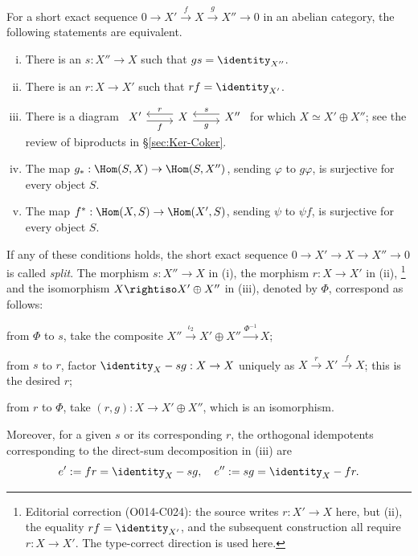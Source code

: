 \begin{proposition}\label{prop:split-ses}
	For a short exact sequence
	$0\to X'\xrightarrow{f}X\xrightarrow{g}X''\to0$ in an abelian category,
	the following statements are equivalent.
	\begin{enumerate}[(i)]
		\item There is an $s:X''\to X$ such that $gs=\identity_{X''}$.
		\item There is an $r:X\to X'$ such that $rf=\identity_{X'}$.
		\item There is a diagram
		$\begin{tikzcd}
			X' \arrow[yshift=-0.7ex, r, "f"'] & X \arrow[yshift=0.7ex, l, "r"'] \arrow[yshift=-0.7ex, r, "g"'] & X'' \arrow[yshift=0.7ex, l, "s"']
		\end{tikzcd}$
		for which $X\simeq X'\oplus X''$; see the review of biproducts in
		\S\ref{sec:Ker-Coker}.
		\item The map $g_*:\Hom(S,X)\to\Hom(S,X'')$, sending $\varphi$ to
		$g\varphi$, is surjective for every object $S$.
		\item The map $f^*:\Hom(X,S)\to\Hom(X',S)$, sending $\psi$ to
		$\psi f$, is surjective for every object $S$.
	\end{enumerate}
	If any of these conditions holds, the short exact sequence
	$0\to X'\to X\to X''\to0$ is called \emph{split}. The morphism
	$s:X''\to X$ in (i), the morphism $r:X\to X'$ in (ii),%
	\footnote{Editorial correction (O014-C024): the source writes
	$r:X'\to X$ here, but (ii), the equality $rf=\identity_{X'}$, and the
	subsequent construction all require $r:X\to X'$. The type-correct direction
	is used here.}
	and the isomorphism $X\rightiso X'\oplus X''$ in (iii), denoted by $\Phi$,
	correspond as follows:
	\begin{compactitem}
		\item from $\Phi$ to $s$, take the composite
		$X''\xrightarrow{\iota_2}X'\oplus X''\xrightarrow{\Phi^{-1}}X$;
		\item from $s$ to $r$, factor $\identity_X-sg:X\to X$ uniquely as
		$X\xrightarrow{r}X'\xrightarrow{f}X$; this is the desired $r$;
		\item from $r$ to $\Phi$, take $(r,g):X\to X'\oplus X''$, which is an
		isomorphism.
	\end{compactitem}

	Moreover, for a given $s$ or its corresponding $r$, the orthogonal
	idempotents corresponding to the direct-sum decomposition in (iii) are
	\[ e' := fr = \identity_X - sg, \quad e'' := sg = \identity_X - fr. \]
\end{proposition}
